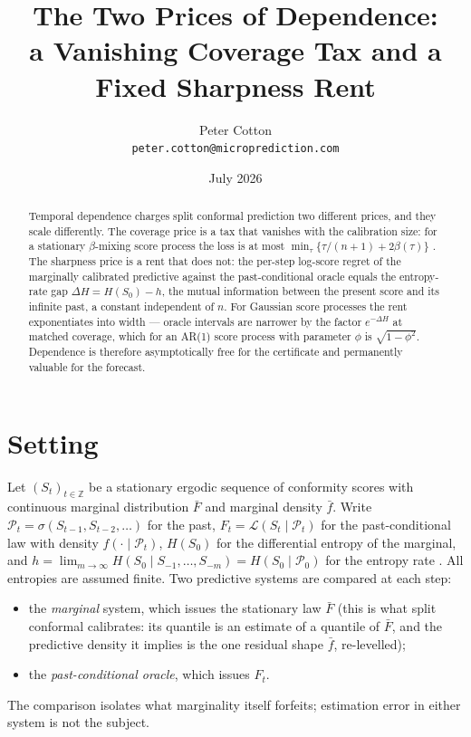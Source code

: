 \documentclass[11pt]{article}
\title{The Two Prices of Dependence:\\
a Vanishing Coverage Tax and a Fixed Sharpness Rent}
\author{Peter Cotton\\\texttt{peter.cotton@microprediction.com}}
\date{July 2026}
\theoremstyle{remark}
\begin{document}
\maketitle

\begin{abstract}
Temporal dependence charges split conformal prediction two different prices, and they scale
differently. The coverage price is a tax that vanishes with the calibration size: for a
stationary $\beta$-mixing score process the loss is at most
$\min_\tau\{\tau/(n+1)+2\beta(\tau)\}$ \citep{barberpananjady2026}. The sharpness price is a rent
that does not: the per-step log-score regret of the marginally calibrated predictive against the
past-conditional oracle equals the entropy-rate gap $\Delta H=H(S_0)-h$, the mutual information
between the present score and its infinite past, a constant independent of $n$. For Gaussian
score processes the rent exponentiates into width --- oracle intervals are narrower by the factor
$e^{-\Delta H}$ at matched coverage, which for an AR(1) score process with parameter $\phi$ is
$\sqrt{1-\phi^{2}}$. Dependence is therefore asymptotically free for the certificate and
permanently valuable for the forecast.
\end{abstract}

\section{Setting}\label{sec:setting}

Let $(S_t)_{t\in\mathbb Z}$ be a stationary ergodic sequence of conformity scores with continuous
marginal distribution $\bar F$ and marginal density $\bar f$. Write
$\mathcal P_t=\sigma(S_{t-1},S_{t-2},\dots)$ for the past, $F_t=\mathcal L(S_t\mid\mathcal P_t)$
for the past-conditional law with density $f(\cdot\mid\mathcal P_t)$, $H(S_0)$ for the
differential entropy of the marginal, and
$h=\lim_{m\to\infty}H(S_0\mid S_{-1},\dots,S_{-m})=H(S_0\mid\mathcal P_0)$ for the entropy rate
\citep{cover2006}. All entropies are assumed finite. Two predictive systems are compared at each
step:
\begin{itemize}
\item the \emph{marginal} system, which issues the stationary law $\bar F$ (this is what split
conformal calibrates: its quantile is an estimate of a quantile of $\bar F$, and the predictive
density it implies is the one residual shape $\bar f$, re-levelled);
\item the \emph{past-conditional oracle}, which issues $F_t$.
\end{itemize}
The comparison isolates what marginality itself forfeits; estimation error in either system is
not the subject.
\end{document}
